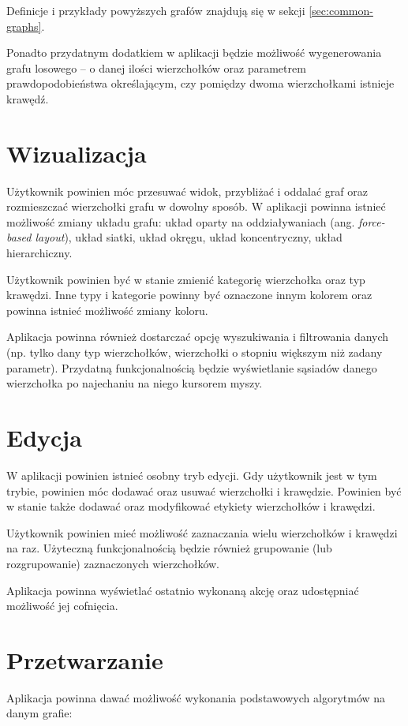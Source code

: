 Definicje i przykłady powyższych grafów znajdują się w sekcji \ref{sec:common-graphs}.

Ponadto przydatnym dodatkiem w aplikacji będzie możliwość wygenerowania grafu losowego -- o danej ilości wierzchołków oraz parametrem prawdopodobieństwa określającym, czy pomiędzy dwoma wierzchołkami istnieje krawędź.  

\section{Wizualizacja}

Użytkownik powinien móc przesuwać widok, przybliżać i oddalać graf oraz rozmieszczać wierzchołki grafu w dowolny sposób. W aplikacji powinna istnieć możliwość zmiany układu grafu: układ oparty na oddziaływaniach (ang. \textit{force-based layout}), układ siatki, układ okręgu, układ koncentryczny, układ hierarchiczny. 

Użytkownik powinien być w stanie zmienić kategorię wierzchołka oraz typ krawędzi. Inne typy i kategorie powinny być oznaczone innym kolorem oraz powinna istnieć możliwość zmiany koloru. 

Aplikacja powinna również dostarczać opcję wyszukiwania i filtrowania danych (np. tylko dany typ wierzchołków, wierzchołki o stopniu większym niż zadany parametr). Przydatną funkcjonalnością będzie wyświetlanie sąsiadów danego wierzchołka po najechaniu na niego kursorem myszy.

\section{Edycja}

W aplikacji powinien istnieć osobny tryb edycji. Gdy użytkownik jest w tym trybie, powinien móc dodawać oraz usuwać wierzchołki i krawędzie. Powinien być w stanie także dodawać oraz modyfikować etykiety wierzchołków i krawędzi.

Użytkownik powinien mieć możliwość zaznaczania wielu wierzchołków i krawędzi na raz. Użyteczną funkcjonalnością będzie również grupowanie (lub rozgrupowanie) zaznaczonych wierzchołków. 

Aplikacja powinna wyświetlać ostatnio wykonaną akcję oraz udostępniać możliwość jej cofnięcia.

\section{Przetwarzanie}

Aplikacja powinna dawać możliwość wykonania podstawowych algorytmów na danym grafie:

